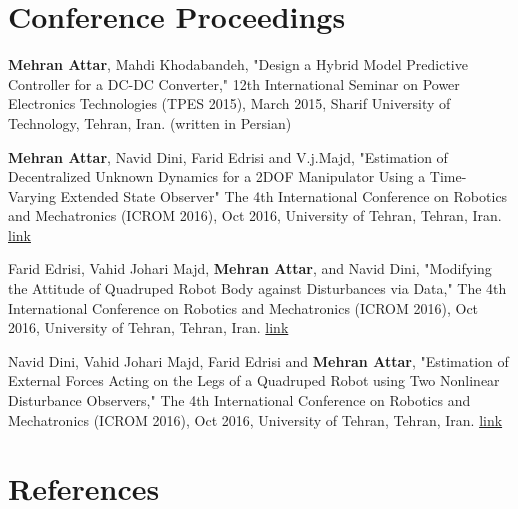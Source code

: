 \documentclass[letterpaper,10.8pt]{article}
\begin{document}
\section{Conference Proceedings}
\begin{enumerate}[label={[\arabic*]}]
  \item \textbf{Mehran Attar}, Mahdi Khodabandeh, "Design a Hybrid Model Predictive Controller for a DC-DC
Converter," 12th International Seminar on Power Electronics Technologies (TPES 2015), March 2015,
Sharif University of Technology, Tehran, Iran. (written in Persian)
  \item \textbf{Mehran Attar}, Navid Dini, Farid Edrisi and V.j.Majd, "Estimation of Decentralized Unknown Dynamics
for a 2DOF Manipulator Using a Time-Varying Extended State Observer" The 4th International
Conference on Robotics and Mechatronics (ICROM 2016), Oct 2016, University of Tehran, Tehran, Iran. \href{https://ieeexplore.ieee.org/document/7886827}{link}
  \item Farid Edrisi, Vahid Johari Majd, \textbf{Mehran Attar}, and Navid Dini, "Modifying the Attitude of Quadruped
Robot Body against Disturbances via Data," The 4th International Conference on Robotics and
Mechatronics (ICROM 2016), Oct 2016, University of Tehran, Tehran, Iran. \href{https://ieeexplore.ieee.org/document/7886817}{link}
%
\item Navid Dini, Vahid Johari Majd, Farid Edrisi and \textbf{Mehran Attar}, "Estimation of External Forces Acting on
the Legs of a Quadruped Robot using Two Nonlinear Disturbance Observers," The 4th International
Conference on Robotics and Mechatronics (ICROM 2016), Oct 2016, University of Tehran, Tehran, Iran. \href{https://ieeexplore.ieee.org/document/7886820}{link}
\end{enumerate}

\section{References}
\end{document}
